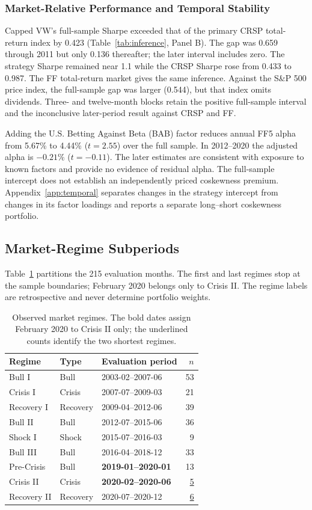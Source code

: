 \documentclass[letterpaper,journal]{IEEEtran}
\begin{document}
\subsubsection{Market-Relative Performance and Temporal Stability}
Capped VW's full-sample Sharpe exceeded that of the primary CRSP total-return index by 0.423 (Table~\ref{tab:inference}, Panel B). The gap was 0.659 through 2011 but only 0.136 thereafter; the later interval includes zero. The strategy Sharpe remained near 1.1 while the CRSP Sharpe rose from 0.433 to 0.987. The FF total-return market gives the same inference. Against the S\&P 500 price index, the full-sample gap was larger (0.544), but that index omits dividends. Three- and twelve-month blocks retain the positive full-sample interval and the inconclusive later-period result against CRSP and FF.

Adding the U.S. Betting Against Beta (BAB) factor reduces annual FF5 alpha from 5.67\% to 4.44\% ($t=2.55$) over the full sample. In 2012--2020 the adjusted alpha is $-0.21\%$ ($t=-0.11$). The later estimates are consistent with exposure to known factors and provide no evidence of residual alpha. The full-sample intercept does not establish an independently priced coskewness premium. Appendix~\ref{app:temporal} separates changes in the strategy intercept from changes in its factor loadings and reports a separate long--short coskewness portfolio.

\subsection{Market-Regime Subperiods}
Table~\ref{tab:coverage} partitions the 215 evaluation months. The first and last regimes stop at the sample boundaries; February 2020 belongs only to Crisis II. The regime labels are retrospective and never determine portfolio weights.

\begin{table}[!t]\centering
\caption{Observed market regimes. The bold dates assign February 2020 to Crisis II only; the underlined counts identify the two shortest regimes.}\label{tab:coverage}
\small\begin{tabular}{lllr}\toprule
Regime & Type & Evaluation period & $n$\\\midrule
Bull I & Bull & 2003-02--2007-06 & 53 \\
Crisis I & Crisis & 2007-07--2009-03 & 21 \\
Recovery I & Recovery & 2009-04--2012-06 & 39 \\
Bull II & Bull & 2012-07--2015-06 & 36 \\
Shock I & Shock & 2015-07--2016-03 & 9 \\
Bull III & Bull & 2016-04--2018-12 & 33 \\
Pre-Crisis & Bull & \textbf{2019-01--2020-01} & 13 \\
Crisis II & Crisis & \textbf{2020-02--2020-06} & \underline{5} \\
Recovery II & Recovery & 2020-07--2020-12 & \underline{6} \\
\bottomrule\end{tabular}\end{table}
\end{document}
